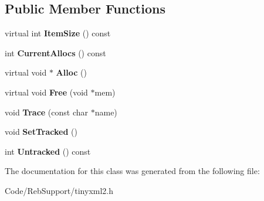 \subsection*{Public Member Functions}
\begin{DoxyCompactItemize}
\item 
virtual int {\bfseries Item\+Size} () const \hypertarget{classtinyxml2_1_1_mem_pool_t_a7ec8778fe99f6e332615a703be0b48bc}{}\label{classtinyxml2_1_1_mem_pool_t_a7ec8778fe99f6e332615a703be0b48bc}

\item 
int {\bfseries Current\+Allocs} () const \hypertarget{classtinyxml2_1_1_mem_pool_t_a56be11b7db6a7ef00db17088a7769aab}{}\label{classtinyxml2_1_1_mem_pool_t_a56be11b7db6a7ef00db17088a7769aab}

\item 
virtual void $\ast$ {\bfseries Alloc} ()\hypertarget{classtinyxml2_1_1_mem_pool_t_aa9d785a48ffe6ea1be679bab13464486}{}\label{classtinyxml2_1_1_mem_pool_t_aa9d785a48ffe6ea1be679bab13464486}

\item 
virtual void {\bfseries Free} (void $\ast$mem)\hypertarget{classtinyxml2_1_1_mem_pool_t_a4f1a0c434e9e3d7391e5c16ed4ee8c70}{}\label{classtinyxml2_1_1_mem_pool_t_a4f1a0c434e9e3d7391e5c16ed4ee8c70}

\item 
void {\bfseries Trace} (const char $\ast$name)\hypertarget{classtinyxml2_1_1_mem_pool_t_a0bc596f271e0f139822c534238b3f244}{}\label{classtinyxml2_1_1_mem_pool_t_a0bc596f271e0f139822c534238b3f244}

\item 
void {\bfseries Set\+Tracked} ()\hypertarget{classtinyxml2_1_1_mem_pool_t_a7798932414916199a1bc0f9c3f368521}{}\label{classtinyxml2_1_1_mem_pool_t_a7798932414916199a1bc0f9c3f368521}

\item 
int {\bfseries Untracked} () const \hypertarget{classtinyxml2_1_1_mem_pool_t_a524b90d0edeac41964c06510757dce0f}{}\label{classtinyxml2_1_1_mem_pool_t_a524b90d0edeac41964c06510757dce0f}

\end{DoxyCompactItemize}


The documentation for this class was generated from the following file\+:\begin{DoxyCompactItemize}
\item 
Code/\+Reb\+Support/tinyxml2.\+h\end{DoxyCompactItemize}
